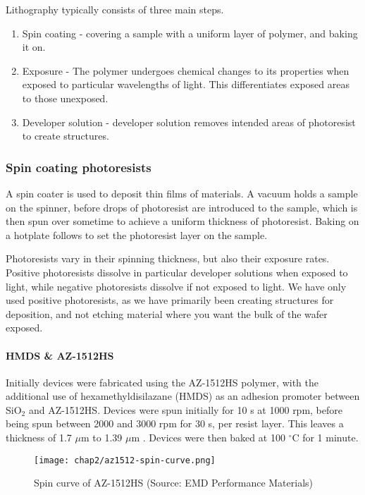 \documentclass[../../Matt_Gebert_Honours_Thesis.tex]{subfiles}
\begin{document}
	Lithography typically consists of three main steps.
	\begin{enumerate}
		\itemsep0em
		\item Spin coating - covering a sample with a uniform layer of polymer, and baking it on.
		\item Exposure - The polymer undergoes chemical changes to its properties when exposed to particular wavelengths of light. This differentiates exposed areas to those unexposed.
		\item Developer solution - developer solution removes intended areas of photoresist to create structures.
	\end{enumerate}
	
	\subsubsection{Spin coating photoresists}\label{sec:resists}
	A spin coater is used to deposit thin films of materials. A vacuum holds a sample on the spinner, before drops of photoresist are introduced to the sample, which is then spun over sometime to achieve a uniform thickness of photoresist. Baking on a hotplate follows to set the photoresist layer on the sample.
	
	Photoresists vary in their spinning thickness, but also their exposure rates. Positive photoresists dissolve in particular developer solutions when exposed to light, while negative photoresists dissolve if not exposed to light. We have only used positive photoresists, as we have primarily been creating structures for deposition, and not etching material where you want the bulk of the wafer exposed.
	
	\paragraph{HMDS \& AZ-1512HS}
	Initially devices were fabricated using the AZ-1512HS polymer, with the additional use of hexamethyldisilazane (HMDS) as an adhesion promoter between SiO$_2$ and AZ-1512HS. Devices were spun initially for 10 s at 1000 rpm, before being spun between 2000 and 3000 rpm for 30 s, per resist layer. This leaves a thickness of 1.7 $\mu$m to 1.39 $\mu$m \cite{az1500_series}.
	Devices were then baked at 100 $^\circ$C for 1 minute.
	
	\begin{figure}[H]\label{fig:spin_curve_AZ-1512HS}
		\centering
		\texttt{[image: chap2/az1512-spin-curve.png]}
		\caption[Spin curve of AZ-1512HS]{Spin curve of AZ-1512HS (Source: EMD Performance Materials\cite{az1500_series_spincurve})}
	\end{figure}
	
\end{document}
